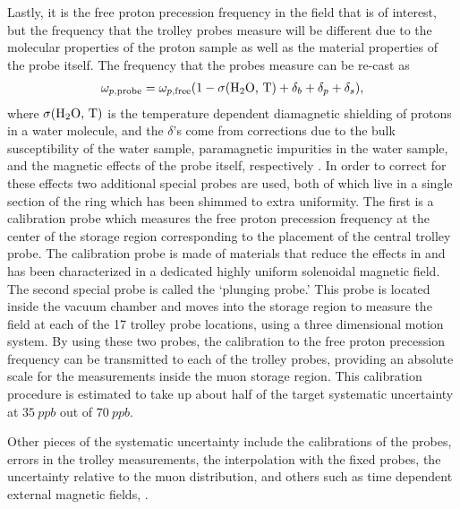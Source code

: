 Lastly, it is the free proton precession frequency in the field that is of interest, but the frequency that the trolley probes measure will be different due to the molecular properties of the proton sample as well as the material properties of the probe itself. The frequency that the probes measure can be re-cast as 
        \begin{align} \label{eq:wpprobe}
            \omega_{p,\text{probe}} = \omega_{p,\text{free}}(1 - \sigma(\text{H\textsubscript{2}O, T}) + \delta_{b} + \delta_{p} + \delta_{s}),
        \end{align}
where $\sigma(\text{H\textsubscript{2}O, T})$ is the temperature dependent diamagnetic shielding of protons in a water molecule, and the $\delta$'s come from corrections due to the bulk susceptibility of the water sample, paramagnetic impurities in the water sample, and the magnetic effects of the probe itself, respectively \cite{TDR}. In order to correct for these effects two additional special probes are used, both of which live in a single section of the ring which has been shimmed to extra uniformity. The first is a calibration probe which measures the free proton precession frequency at the center of the storage region corresponding to the placement of the central trolley probe. The calibration probe is made of materials that reduce the effects in  and has been characterized in a dedicated highly uniform solenoidal magnetic field. The second special probe is called the `plunging probe.' This probe is located inside the vacuum chamber and moves into the storage region to measure the field at each of the 17 trolley probe locations, using a three dimensional motion system. By using these two probes, the calibration to the free proton precession frequency can be transmitted to each of the trolley probes, providing an absolute scale for the measurements inside the muon storage region. This calibration procedure is estimated to take up about half of the target systematic uncertainty at $\SI{35}{ppb}$ out of $\SI{70}{ppb}$.


Other pieces of the systematic uncertainty include the calibrations of the probes, errors in the trolley measurements, the interpolation with the fixed probes, the uncertainty relative to the muon distribution, and others such as time dependent external magnetic fields, .



